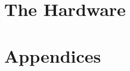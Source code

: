 \documentclass[11pt,twoside,openright]{book}
\begin{document}
\part{The Hardware}


\appendix
\part{Appendices}



\backmatter
\cleardoublepage
{}
{}
\printindex
\end{document}
